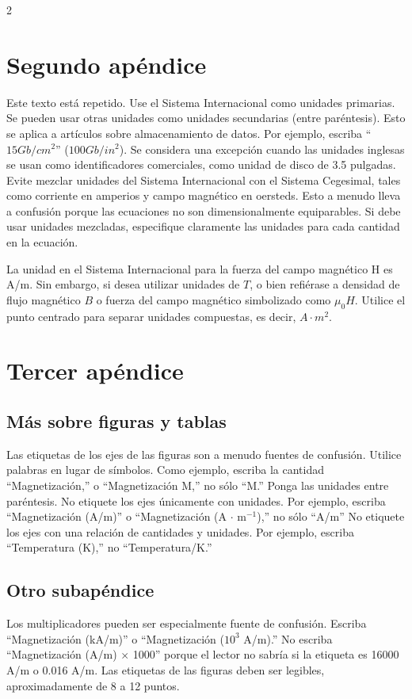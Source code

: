 \documentclass[5p,times,authoryear]{sciarticle}
\begin{document}
\begin{multicols}{2}
\section{Segundo apéndice}

Este texto está repetido. Use el Sistema Internacional como unidades primarias. Se pueden usar
otras unidades como unidades secundarias (entre paréntesis). Esto se
aplica a artículos sobre almacenamiento de datos. Por ejemplo,
escriba ``$15 Gb/cm^2$'' ($100 Gb/in^2$). Se considera una excepción
cuando las unidades inglesas se usan como identificadores
comerciales, como unidad de disco de 3.5 pulgadas. Evite mezclar
unidades del Sistema Internacional con el Sistema Cegesimal, tales
como corriente en amperios y campo magnético en  oersteds. Esto a
menudo lleva a confusión porque las ecuaciones no son
dimensionalmente equiparables. Si debe usar unidades mezcladas,
especifique claramente las unidades para cada cantidad  en la
ecuación.

La unidad en el Sistema Internacional para la fuerza del campo
magnético H es A/m. Sin embargo, si desea utilizar unidades de $T$,
o bien refiérase a densidad de flujo magnético $B$ o fuerza del
campo magnético simbolizado como $\mu_0 H$. Utilice el punto
centrado para separar unidades compuestas,  es decir, $A\cdot m^2$.

\section{Tercer apéndice}

\subsection{Más sobre figuras y tablas}

Las etiquetas de los ejes de las figuras son a menudo fuentes de
confusión. Utilice palabras en lugar de símbolos. Como ejemplo,
escriba la cantidad ``Magnetización,'' o ``Magnetización M,'' no
sólo ``M.'' Ponga las unidades entre paréntesis. No etiquete los
ejes únicamente con unidades. Por ejemplo,
escriba ``Magnetización (A/m)'' o ``Magnetización (A $\cdot$
m$^{-1}$),'' no sólo ``A/m'' No etiquete los ejes con una relación
de cantidades y unidades. Por ejemplo, escriba ``Temperatura (K),''
no ``Temperatura/K.''

\subsection{Otro subapéndice}

Los multiplicadores pueden ser especialmente fuente de confusión.
Escriba ``Magnetización (kA/m)'' o ``Magnetización ($10^3$ A/m).'' No
escriba ``Magnetización (A/m) $\times$ 1000'' porque el lector no
sabría si la etiqueta es 16000 A/m o
0.016 A/m. Las etiquetas de las figuras deben ser legibles,
aproximadamente de 8 a 12 puntos.

\end{multicols}
\end{document}
